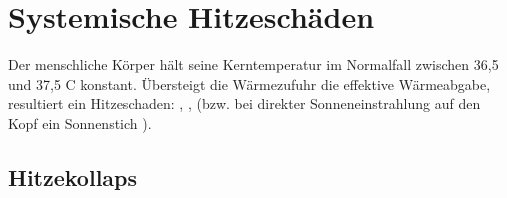 % 
% 
% 
% 
% 
% 
% 
% 
% 
% 
% 
% 
% 
% 
% 
% 
% 
% 
% 
% 
% 

\clearpage
\section{Systemische Hitzeschäden}

Der menschliche Körper hält seine Kerntemperatur  im Normalfall
zwischen 36,5{\textdegree}  und 37,5{\textdegree} C  konstant.
Übersteigt  die Wärmezufuhr die effektive  Wärmeabgabe,
resultiert ein Hitzeschaden:  , 
 , 
 (bzw. bei  direkter Sonneneinstrahlung auf den Kopf ein  Sonnen\-stich
).



\subsection{Hitzekollaps}

